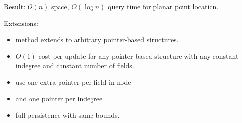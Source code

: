 \documentclass{article}
\begin{document}
Result: $O(n)$ space, $O(\log n)$ query time for planar point
location.

Extensions:
\begin{itemize}
\item method extends to arbitrary pointer-based structures.  
\item $O(1)$ cost per update for any pointer-based structure with any
  constant indegree and constant number of fields.
\item use one extra pointer per field in node
\item and one pointer per indegree
\item full persistence with same bounds.
\end{itemize}
\end{document}
